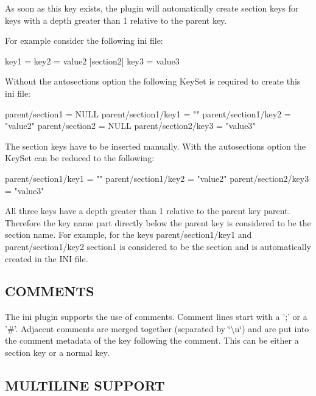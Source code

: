 As soon as this key exists, the plugin will automatically create section keys for keys with a depth greater than 1 relative to the parent key.

For example consider the following ini file\+: \begin{DoxyVerb}                            [section1]
                            key1 =
                            key2 = value2
                            [section2]
                            key3 = value3
\end{DoxyVerb}


Without the autosections option the following Key\+Set is required to create this ini file\+: \begin{DoxyVerb}                            parent/section1 = NULL
                            parent/section1/key1 = ""
                            parent/section1/key2 = "value2"
                            parent/section2 = NULL
                            parent/section2/key3 = "value3"
\end{DoxyVerb}


The section keys have to be inserted manually. With the autosections option the Key\+Set can be reduced to the following\+: \begin{DoxyVerb}                            parent/section1/key1 = ""
                            parent/section1/key2 = "value2"
                            parent/section2/key3 = "value3"
\end{DoxyVerb}


All three keys have a depth greater than 1 relative to the parent key {\ttfamily parent}. Therefore the key name part directly below the parent key is considered to be the section name. For example, for the keys {\ttfamily parent/section1/key1} and {\ttfamily parent/section1/key2} {\ttfamily section1} is considered to be the section and is automatically created in the I\+N\+I file.

\subsection*{C\+O\+M\+M\+E\+N\+T\+S}

The ini plugin supports the use of comments. Comment lines start with a ';' or a '\#'. Adjacent comments are merged together (separated by \char`\"{}\textbackslash{}n\char`\"{}) and are put into the comment metadata of the key following the comment. This can be either a section key or a normal key.

\subsection*{M\+U\+L\+T\+I\+L\+I\+N\+E S\+U\+P\+P\+O\+R\+T}

